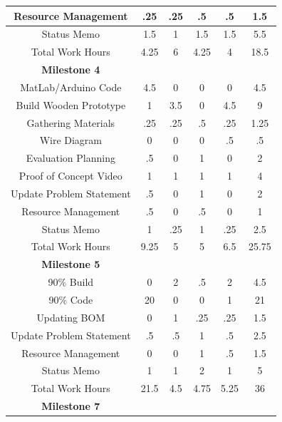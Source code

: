 \documentclass[conference]{IEEEtran}
\begin{document}
\begin{table}[H]
\begin{tabular}{| c | c | c | c | c | c |}
       \hline
       Resource Management & .25 & .25 & .5 & .5 & 1.5\\
       \hline
       \rowcolor{blue!25} Status Memo & 1.5 & 1 & 1.5 & 1.5 & 5.5\\
       \hline
       Total Work Hours & 4.25 & 6 & 4.25 & 4 & 18.5\\
       \hline
       \rowcolor{lightgray} \textbf{Milestone 4} & & & & &\\
       \hline
       \rowcolor{blue!25} MatLab/Arduino Code & 4.5 & 0 & 0 & 0 & 4.5\\
       \hline
       Build Wooden Prototype & 1 & 3.5 & 0 & 4.5 & 9\\
       \hline
       \rowcolor{blue!25} Gathering Materials & .25 & .25 & .5 & .25 & 1.25\\
       \hline
       Wire Diagram & 0 & 0 & 0 & .5 & .5\\
       \hline
       \rowcolor{blue!25} Evaluation Planning & .5 & 0 & 1 & 0 & 2\\
       \hline
       Proof of Concept Video & 1 & 1 & 1 & 1 & 4\\
       \hline
       \rowcolor{blue!25} Update Problem Statement & .5 & 0 & 1 & 0 & 2\\
       \hline
       Resource Management & .5 & 0 & .5 & 0 & 1\\
       \hline
       \rowcolor{blue!25} Status Memo & 1 & .25 & 1 & .25 & 2.5\\
       \hline
       Total Work Hours & 9.25 & 5 & 5 & 6.5 & 25.75\\
       \hline
       \rowcolor{lightgray} \textbf{Milestone 5} & & & & &\\
       \hline
       \rowcolor{blue!25} 90\% Build & 0 & 2 & .5 & 2 & 4.5\\
       \hline
       90\% Code & 20 & 0 & 0 & 1 & 21\\
       \hline
       \rowcolor{blue!25} Updating BOM & 0 & 1 & .25 & .25 & 1.5\\
       \hline
       Update Problem Statement & .5 & .5 & 1 & .5 & 2.5\\
       \hline
       \rowcolor{blue!25} Resource Management & 0 & 0 & 1 & .5 & 1.5\\
       \hline
       Status Memo & 1 & 1 & 2 & 1 & 5\\
       \hline
       \rowcolor{blue!25} Total Work Hours & 21.5 & 4.5 & 4.75 & 5.25 & 36\\
       \hline
       \rowcolor{lightgray} \textbf{Milestone 7} & & & & &\\

\end{tabular}
\end{table}
\end{document}
